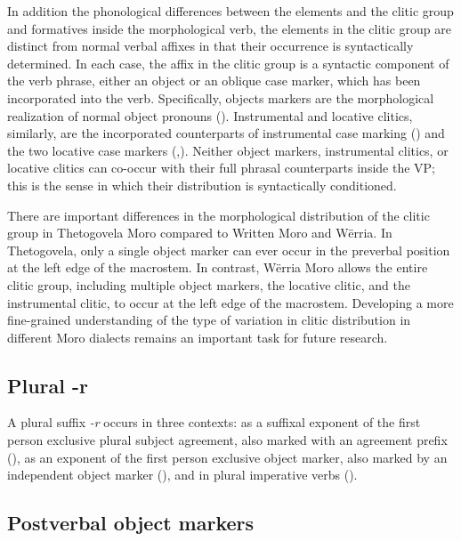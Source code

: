 In addition the phonological differences between the elements and the clitic group and formatives inside the morphological verb, the elements in the clitic group are distinct from normal verbal affixes in that their occurrence is syntactically determined. In each case, the affix in the clitic group is a syntactic component of the verb phrase, either an object or an oblique case marker, which has been incorporated into the verb. Specifically, objects markers are the morphological realization of normal object pronouns (). Instrumental and locative clitics, similarly, are the incorporated counterparts of instrumental case marking () and the two locative case markers (,). Neither object markers, instrumental clitics, or locative clitics can co-occur with their full phrasal counterparts inside the VP; this is the sense in which their distribution is syntactically conditioned.

There are important differences in the morphological distribution of the clitic group in Thetogovela Moro compared to Written Moro and Wërria. In Thetogovela, only a single object marker can ever occur in the preverbal position at the left edge of the macrostem. In contrast, Wërria Moro allows the entire clitic group, including multiple object markers, the locative clitic, and the instrumental clitic, to occur at the left edge of the macrostem. Developing a more fine-grained understanding of the type of variation in clitic distribution in different Moro dialects remains an important task for future research.


\subsection{Plural -r}
\label{sec:ch11:objectpost}

A plural suffix \textit{-r} occurs in three contexts: as a suffixal exponent of the first person exclusive plural subject agreement, also marked with an agreement prefix (), as an exponent of the first person exclusive object marker, also marked by an independent object marker (), and in plural imperative verbs (). %

\subsection{Postverbal object markers}\label{sec:ch11:objectpost}

